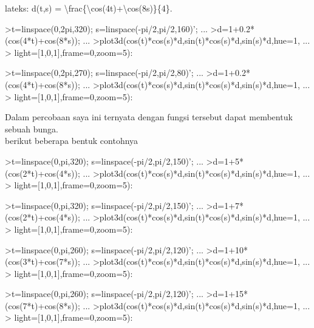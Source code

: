 \documentclass[a4paper,10pt]{article}
\begin{document}
\begin{eulernotebook}
\begin{eulercomment}
\begin{eulercomment}
\begin{eulercomment}
lateks: d(t,s) = \textbackslash{}frac\{\textbackslash{}cos(4t)+\textbackslash{}cos(8s)\}\{4\}.
\end{eulercomment}
\begin{eulerprompt}
>t=linspace(0,2pi,320); s=linspace(-pi/2,pi/2,160)'; ...
>d=1+0.2*(cos(4*t)+cos(8*s)); ...
>plot3d(cos(t)*cos(s)*d,sin(t)*cos(s)*d,sin(s)*d,hue=1, ...
>  light=[1,0,1],frame=0,zoom=5):
\end{eulerprompt}
\begin{eulerprompt}
>t=linspace(0,2pi,270); s=linspace(-pi/2,pi/2,80)'; ...
>d=1+0.2*(cos(4*t)+cos(8*s)); ...
>plot3d(cos(t)*cos(s)*d,sin(t)*cos(s)*d,sin(s)*d,hue=1, ...
>  light=[1,0,1],frame=0,zoom=5):
\end{eulerprompt}
\begin{eulercomment}
Dalam percobaan saya ini ternyata dengan fungsi tersebut dapat
membentuk sebuah bunga.\\
berikut beberapa bentuk contohnya
\end{eulercomment}
\begin{eulerprompt}
>t=linspace(0,pi,320); s=linspace(-pi/2,pi/2,150)'; ...
>d=1+5*(cos(2*t)+cos(4*s)); ...
>plot3d(cos(t)*cos(s)*d,sin(t)*cos(s)*d,sin(s)*d,hue=1, ...
>  light=[1,0,1],frame=0,zoom=5):
\end{eulerprompt}
\begin{eulerprompt}
>t=linspace(0,pi,320); s=linspace(-pi/2,pi/2,150)'; ...
>d=1+7*(cos(2*t)+cos(4*s)); ...
>plot3d(cos(t)*cos(s)*d,sin(t)*cos(s)*d,sin(s)*d,hue=1, ...
>  light=[1,0,1],frame=0,zoom=5):
\end{eulerprompt}
\begin{eulerprompt}
>t=linspace(0,pi,260); s=linspace(-pi/2,pi/2,120)'; ...
>d=1+10*(cos(3*t)+cos(7*s)); ...
>plot3d(cos(t)*cos(s)*d,sin(t)*cos(s)*d,sin(s)*d,hue=1, ...
>  light=[1,0,1],frame=0,zoom=5):
\end{eulerprompt}
\begin{eulerprompt}
>t=linspace(0,pi,260); s=linspace(-pi/2,pi/2,120)'; ...
>d=1+15*(cos(7*t)+cos(8*s)); ...
>plot3d(cos(t)*cos(s)*d,sin(t)*cos(s)*d,sin(s)*d,hue=1, ...
>  light=[1,0,1],frame=0,zoom=5):
\end{eulerprompt}

\end{eulercomment}
\end{eulercomment}
\end{eulernotebook}
\end{document}
